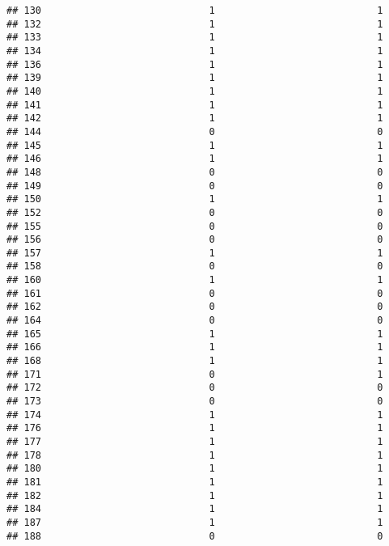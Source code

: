 \documentclass[
]{article}
\begin{document}
\begin{verbatim}
## 130                             1                            1
## 132                             1                            1
## 133                             1                            1
## 134                             1                            1
## 136                             1                            1
## 139                             1                            1
## 140                             1                            1
## 141                             1                            1
## 142                             1                            1
## 144                             0                            0
## 145                             1                            1
## 146                             1                            1
## 148                             0                            0
## 149                             0                            0
## 150                             1                            1
## 152                             0                            0
## 155                             0                            0
## 156                             0                            0
## 157                             1                            1
## 158                             0                            0
## 160                             1                            1
## 161                             0                            0
## 162                             0                            0
## 164                             0                            0
## 165                             1                            1
## 166                             1                            1
## 168                             1                            1
## 171                             0                            1
## 172                             0                            0
## 173                             0                            0
## 174                             1                            1
## 176                             1                            1
## 177                             1                            1
## 178                             1                            1
## 180                             1                            1
## 181                             1                            1
## 182                             1                            1
## 184                             1                            1
## 187                             1                            1
## 188                             0                            0

\end{verbatim}
\end{document}
